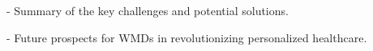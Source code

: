 \documentclass[journal]{IEEEtran}
\begin{document}
- Summary of the key challenges and potential solutions.

- Future prospects for WMDs in revolutionizing personalized healthcare.











%





\end{document}
